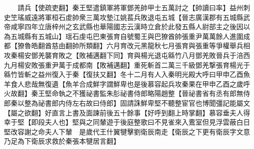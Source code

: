 　　請兵【使疏吏翻】秦王堅遣鎮軍將軍鄧羌帥甲士五萬討之【帥讀曰率】益州刺史笁瑤威遠將軍桓石䖍帥衆三萬攻墊江姚萇兵敗退屯五城【晉志廣漢郡有五城縣武帝咸寧四年立唐梓州之玄武縣也華陽國志云漢時立倉於此發五縣人尉部主之後因以為五城縣有五城山】瑶石虔屯巴東張育自號蜀王與巴獠酋帥張重尹萬萬餘人進圍成都【獠魯皓翻酋慈由翻帥所類翻】六月育改元黑龍秋七月張育與張重等爭權舉兵相攻秦楊安鄧羌襲育敗之【敗補邁翻下同】育與楊光退屯緜竹八月鄧羌敗晉兵于涪西九月楊安敗張重尹萬于成都南【敗補邁翻】重死斬首二萬三千級鄧羌撃張育楊光于緜竹皆斬之益州復入于秦【復扶又翻】冬十二月有人入秦明光殿大呼曰甲申乙酉魚羊食人悲哉無復遺【魚羊合成鮮字謂鮮卑也是後慕容起兵攻秦果在甲申乙酉之歲呼火故翻】秦王堅命執之不獲祕書監朱肜祕書侍郎略陽趙整【晉祕書省有丞有郎無侍郎秦以整為祕書郎内侍左右故曰侍郎】固請誅鮮卑堅不聽整宦官也博聞彊記能屬文【屬之欲翻】好直言上書及面諫前後五十餘事【好呼到翻上時掌翻】慕容垂夫人得幸于堅【即段夫人也】堅與之同輦遊于後庭整歌曰不見雀來入鷰室但見浮雲蔽白日堅改容謝之命夫人下輦　是歲代王什翼犍擊劉衛辰南走【衛辰之下更有衛辰字文意乃足為下衛辰求救於秦張本犍居言翻】

